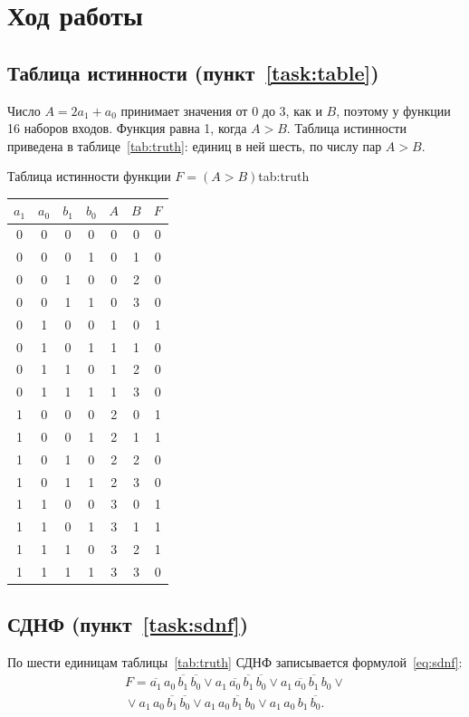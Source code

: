 \section{Ход работы}

\subsection{Таблица истинности (пункт~\ref{task:table})}
Число $A = 2a_1 + a_0$ принимает значения от 0 до 3, как и $B$, поэтому у функции 16
наборов входов. Функция равна 1, когда $A > B$. Таблица истинности приведена в
таблице~\ref{tab:truth}: единиц в ней шесть, по числу пар $A > B$.

\begin{bbttable}{Таблица истинности функции $F = (A > B)$}{tab:truth}
  \begin{tabular}{|c|c|c|c|c|c|c|}
    \hline
    $a_1$ & $a_0$ & $b_1$ & $b_0$ & $A$ & $B$ & $F$ \\ \hline
    0 & 0 & 0 & 0 & 0 & 0 & 0 \\ \hline
    0 & 0 & 0 & 1 & 0 & 1 & 0 \\ \hline
    0 & 0 & 1 & 0 & 0 & 2 & 0 \\ \hline
    0 & 0 & 1 & 1 & 0 & 3 & 0 \\ \hline
    0 & 1 & 0 & 0 & 1 & 0 & 1 \\ \hline
    0 & 1 & 0 & 1 & 1 & 1 & 0 \\ \hline
    0 & 1 & 1 & 0 & 1 & 2 & 0 \\ \hline
    0 & 1 & 1 & 1 & 1 & 3 & 0 \\ \hline
    1 & 0 & 0 & 0 & 2 & 0 & 1 \\ \hline
    1 & 0 & 0 & 1 & 2 & 1 & 1 \\ \hline
    1 & 0 & 1 & 0 & 2 & 2 & 0 \\ \hline
    1 & 0 & 1 & 1 & 2 & 3 & 0 \\ \hline
    1 & 1 & 0 & 0 & 3 & 0 & 1 \\ \hline
    1 & 1 & 0 & 1 & 3 & 1 & 1 \\ \hline
    1 & 1 & 1 & 0 & 3 & 2 & 1 \\ \hline
    1 & 1 & 1 & 1 & 3 & 3 & 0 \\ \hline
  \end{tabular}
\end{bbttable}

\subsection{СДНФ (пункт~\ref{task:sdnf})}
По шести единицам таблицы~\ref{tab:truth} СДНФ записывается формулой~\eqref{eq:sdnf}:
\begin{multline}\label{eq:sdnf}
  F = \overline{a_1}\, a_0\, \overline{b_1}\, \overline{b_0}
  \vee a_1\, \overline{a_0}\, \overline{b_1}\, \overline{b_0}
  \vee a_1\, \overline{a_0}\, \overline{b_1}\, b_0 \vee {} \\
  {} \vee a_1\, a_0\, \overline{b_1}\, \overline{b_0}
  \vee a_1\, a_0\, \overline{b_1}\, b_0
  \vee a_1\, a_0\, b_1\, \overline{b_0}.
\end{multline}

